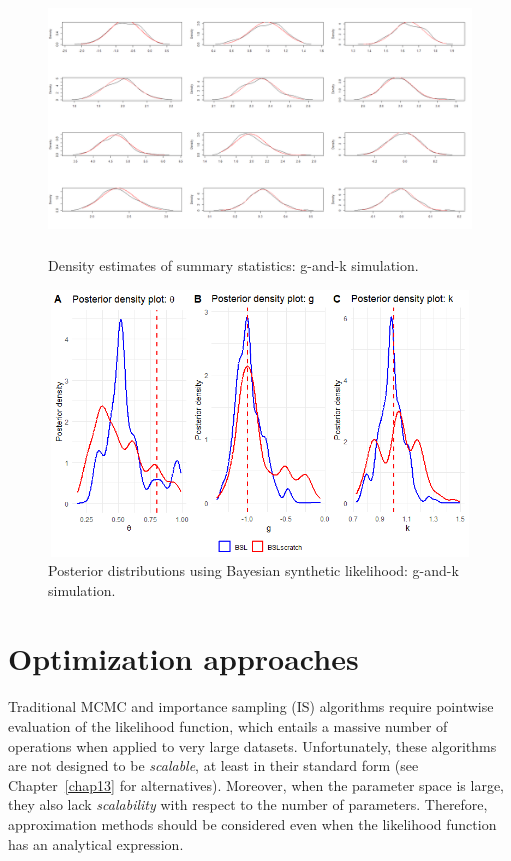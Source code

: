 \begin{figure}[!h]
	\includegraphics[width=340pt, height=200pt]{Chapters/chapter15/figures/DensitiesSum.png}
	\caption[List of figure caption goes here]{Density estimates of summary statistics: g-and-k simulation.}\label{figDensSum}
\end{figure} 

\begin{figure}[!h]
	\includegraphics[width=340pt, height=200pt]{Chapters/chapter15/figures/BSLgksim.png}
	\caption[List of figure caption goes here]{Posterior distributions using Bayesian synthetic likelihood: g-and-k simulation.}\label{figBSL}
\end{figure}


\section{Optimization approaches}\label{sec15_2}

Traditional MCMC and importance sampling (IS) algorithms require pointwise evaluation of the likelihood function, which entails a massive number of operations when applied to very large datasets. Unfortunately, these algorithms are not designed to be \textit{scalable}, at least in their standard form (see Chapter~\ref{chap13} for alternatives). Moreover, when the parameter space is large, they also lack \textit{scalability} with respect to the number of parameters. Therefore, approximation methods should be considered even when the likelihood function has an analytical expression.

